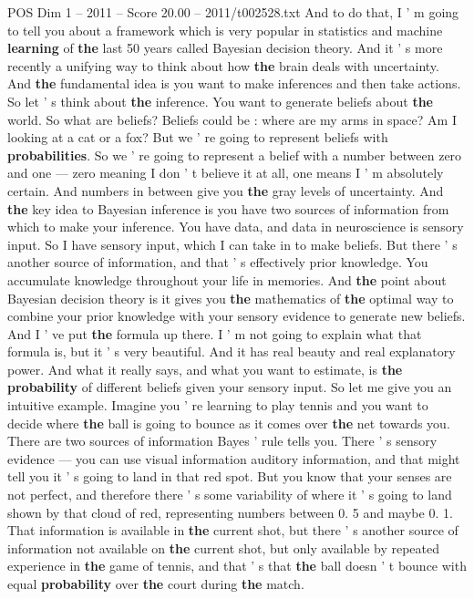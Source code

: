 \begin{textsample}{POS Dim 1 – 2011 – Score 20.00 – 2011/t002528.txt}
And to do that, I ' m going to tell you about a framework which is very popular in statistics and machine \textbf{learning} of \textbf{the} last 50 years called Bayesian decision theory.
And it ' s more recently a unifying way to think about how \textbf{the} brain deals with uncertainty.
And \textbf{the} fundamental idea is you want to make inferences and then take actions.
So let ' s think about \textbf{the} inference.
You want to generate beliefs about \textbf{the} world.
So what are beliefs?
Beliefs could be : where are my arms in space?
Am I looking at a cat or a fox?
But we ' re going to represent beliefs with \textbf{probabilities}.
So we ' re going to represent a belief with a number between zero and one — zero meaning I don ' t believe it at all, one means I ' m absolutely certain.
And numbers in between give you \textbf{the} gray levels of uncertainty.
And \textbf{the} key idea to Bayesian inference is you have two sources of information from which to make your inference.
You have data, and data in neuroscience is sensory input.
So I have sensory input, which I can take in to make beliefs.
But there ' s another source of information, and that ' s effectively prior knowledge.
You accumulate knowledge throughout your life in memories.
And \textbf{the} point about Bayesian decision theory is it gives you \textbf{the} mathematics of \textbf{the} optimal way to combine your prior knowledge with your sensory evidence to generate new beliefs.
And I ' ve put \textbf{the} formula up there.
I ' m not going to explain what that formula is, but it ' s very beautiful.
And it has real beauty and real explanatory power.
And what it really says, and what you want to estimate, is \textbf{the} \textbf{probability} of different beliefs given your sensory input.
So let me give you an intuitive example.
Imagine you ' re learning to play tennis and you want to decide where \textbf{the} ball is going to bounce as it comes over \textbf{the} net towards you.
There are two sources of information Bayes ' rule tells you.
There ' s sensory evidence — you can use visual information auditory information, and that might tell you it ' s going to land in that red spot.
But you know that your senses are not perfect, and therefore there ' s some variability of where it ' s going to land shown by that cloud of red, representing numbers between 0. 5 and maybe 0. 1.
That information is available in \textbf{the} current shot, but there ' s another source of information not available on \textbf{the} current shot, but only available by repeated experience in \textbf{the} game of tennis, and that ' s that \textbf{the} ball doesn ' t bounce with equal \textbf{probability} over \textbf{the} court during \textbf{the} match.

\end{textsample}
